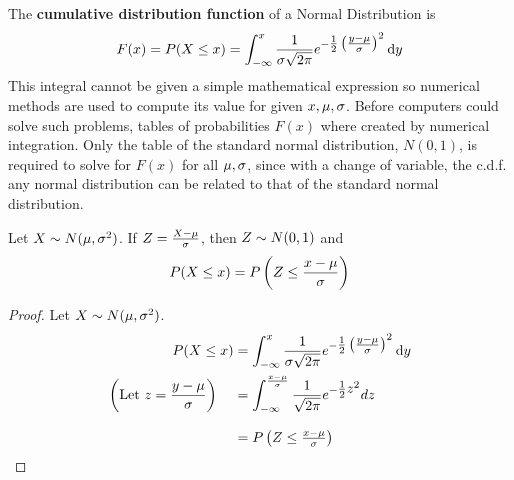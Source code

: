 The \textbf{cumulative distribution function} of a Normal Distribution is 
\[
    F(x) = P(X\le x) = \int_{-\infty}^x \frac{1}{\sigma\sqrt{2\pi}}
    e^{-\textstyle\frac{1}{2}\left(\frac{y - \mu}{\sigma}\right)^2} \operatorname{d}\!{y}
\]
This integral cannot be given a simple mathematical expression so numerical methods are used to compute its value for given $x,\mu,\sigma$. Before computers could solve such problems, tables of probabilities $F(x)$ where created by numerical integration. Only the table of the standard normal distribution, $N(0,1)$, is required to solve for $F(x)$ for all $\mu,\sigma$, since with a change of variable, the c.d.f. any normal distribution can be related to that of the standard normal distribution.
\begin{theorem}
Let $X \sim N(\mu,\sigma^2)$. If $Z = \frac{X - \mu}{\sigma}$, then $Z \sim N(0,1)$ and
\[
    P(X \le x) = P\left(Z \le \frac{x - \mu}{\sigma}\right)
\]
\end{theorem}
\begin{proof}
Let $X \sim N(\mu,\sigma^2)$.
\begin{align*}
    P(X\le x) 
    &= \int_{-\infty}^x \frac{1}{\sigma\sqrt{2\pi}}
        e^{-\textstyle\frac{1}{2}\left(\frac{y - \mu}{\sigma}\right)^2} \operatorname{d}\!{y} \\
    \left(\text{Let }z = \frac{y-\mu}{\sigma}\right)\hspace{12pt} 
    &= \int_{-\infty}^{\frac{x - \mu}{\sigma}} \frac{1}{\sqrt{2\pi}}
        e^{-\textstyle\frac{1}{2}z^2} dz \\[8pt plus 2pt minus 4pt]
    &= P\left(Z\le\textstyle\frac{x - \mu}{\sigma}\right)
\end{align*}
\end{proof}
